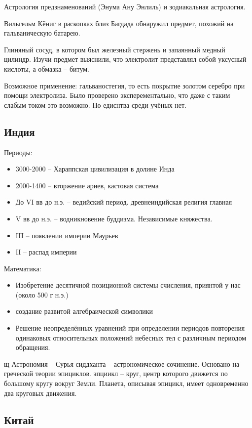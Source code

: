 \documentclass{book}
\theoremstyle{definition}
\begin{document}
   Астрология предзнаменований (Энума Ану Энлиль) и зодиакальная астрология.

   Вильгельм Кёниг в раскопках близ Багдада обнаружил предмет, похожий на гальваническую батарею.

   Глиняный сосуд, в котором был железный стержень и запаянный медный цилиндр. Изучи предмет выяснили, что электролит представлял собой уксусный кислоты, а обмазка -- битум.

   Возможное применение: гальваностегия, то есть покрытие золотом серебро при помощи электролиза. Было проверено эксперементально, что даже с таким слабым током это возможно. Но едиснтва среди учёных нет.

   \subsection{Индия}

   Периоды:
   \begin{itemize}
       \item  3000-2000 -- Хараппская цивилизация в долине Инда
       \item 2000-1400 -- вторжение ариев, кастовая система
       \item До VI вв до н.э. -- ведийский период. древнеиндийская религия главная
       \item V вв до н.э.  -- водникновение буддизма. Независимые княжества.
       \item III -- появлении империи Маурьев
       \item II -- распад империи
   \end{itemize}

   Математика:
   \begin{itemize}
       \item  Изобретение десятичной позиционной системы счисления, приянтой у нас (около 500 г н.э.)
       \item создание развитой алгебраической символики
       \item Решение неопределённых уравнений при определении периодов повторения одинаковых относительных положений небесных тел с различным периодом обращения.
   \end{itemize}щ
   Астрономия -- Сурья-сиддханта -- астрономическое сочинение. Основано на греческой теории эпициклов. эпциикл -- круг, центр которого движется по большому кругу вокруг Земли. Планета, описывая эпицикл, имеет одновременно два круговых движения.

   \subsection{Китай}
\end{document}
